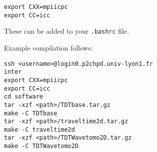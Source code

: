 \documentclass[a4paper,12pt]{article}
\begin{document}
\begin{verbatim}
export CXX=mpiicpc
export CC=icc
\end{verbatim}

These can be added to your {\tt .bashrc} file.

Example compilation follows:

\begin{verbatim}
ssh <username>@login0.p2chpd.univ-lyon1.fr
inter
export CXX=mpiicpc
export CC=icc
cd software
tar -xzf <path>/TDTbase.tar.gz
make -C TDTbase
tar -xzf <path>/traveltime2d.tar.gz
make -C traveltime2d
tar -xzf <path>/TDTWavetomo2D.tar.gz
make -C TDTWavetomo2D
\end{verbatim}



\end{document}
